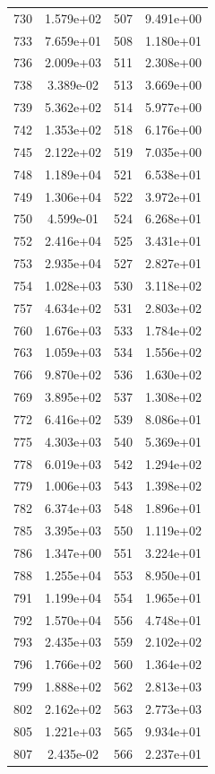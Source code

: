\documentclass[12pt]{article}
\begin{document}
\begin{longtable}{@{}cccc@{}}
730 & 1.579e+02 & 507 & 9.491e+00 \\
733 & 7.659e+01 & 508 & 1.180e+01 \\
736 & 2.009e+03 & 511 & 2.308e+00 \\
738 & 3.389e-02 & 513 & 3.669e+00 \\
739 & 5.362e+02 & 514 & 5.977e+00 \\
742 & 1.353e+02 & 518 & 6.176e+00 \\
745 & 2.122e+02 & 519 & 7.035e+00 \\
748 & 1.189e+04 & 521 & 6.538e+01 \\
749 & 1.306e+04 & 522 & 3.972e+01 \\
750 & 4.599e-01 & 524 & 6.268e+01 \\
752 & 2.416e+04 & 525 & 3.431e+01 \\
753 & 2.935e+04 & 527 & 2.827e+01 \\
754 & 1.028e+03 & 530 & 3.118e+02 \\
757 & 4.634e+02 & 531 & 2.803e+02 \\
760 & 1.676e+03 & 533 & 1.784e+02 \\
763 & 1.059e+03 & 534 & 1.556e+02 \\
766 & 9.870e+02 & 536 & 1.630e+02 \\
769 & 3.895e+02 & 537 & 1.308e+02 \\
772 & 6.416e+02 & 539 & 8.086e+01 \\
775 & 4.303e+03 & 540 & 5.369e+01 \\
778 & 6.019e+03 & 542 & 1.294e+02 \\
779 & 1.006e+03 & 543 & 1.398e+02 \\
782 & 6.374e+03 & 548 & 1.896e+01 \\
785 & 3.395e+03 & 550 & 1.119e+02 \\
786 & 1.347e+00 & 551 & 3.224e+01 \\
788 & 1.255e+04 & 553 & 8.950e+01 \\
791 & 1.199e+04 & 554 & 1.965e+01 \\
792 & 1.570e+04 & 556 & 4.748e+01 \\
793 & 2.435e+03 & 559 & 2.102e+02 \\
796 & 1.766e+02 & 560 & 1.364e+02 \\
799 & 1.888e+02 & 562 & 2.813e+03 \\
802 & 2.162e+02 & 563 & 2.773e+03 \\
805 & 1.221e+03 & 565 & 9.934e+01 \\
807 & 2.435e-02 & 566 & 2.237e+01 \\

\end{longtable}
\end{document}
